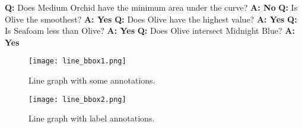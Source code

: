 \documentclass{article} \usepackage{iclr2018_workshop,times}
\begin{document}
\begin{multicols}{2}
\textbf{Q:} Does Medium Orchid have the minimum area under the curve?\newline
\textbf{A: No}\newline\newline
\textbf{Q:} Is Olive the smoothest?\newline
\textbf{A: Yes}\newline\newline\newline
\textbf{Q:} Does Olive have the highest value?\newline
\textbf{A: Yes}\newline\newline
\textbf{Q:} Is Seafoam less than Olive?\newline
\textbf{A: Yes}\newline\newline
\textbf{Q:} Does Olive intersect Midnight Blue?\newline
\textbf{A: Yes}
\end{multicols}

\begin{SCfigure}[][h]
    \texttt{[image: line\_bbox1.png]}
    \caption{Line graph with some annotations.}
    \label{fig:line_anno}
\end{SCfigure}

\begin{SCfigure}[][h]
    \texttt{[image: line\_bbox2.png]}
    \caption{Line graph with label annotations.}
    \label{fig:line_anno2}
\end{SCfigure}

\clearpage
\end{document}
